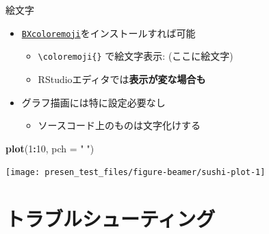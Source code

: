 \documentclass[
  14pt,
  ignorenonframetext,
]{beamer}
\newenvironment{Shaded}{\begin{snugshade}}{\end{snugshade}}
\newcommand{\DataTypeTok}[1]{\textcolor[rgb]{0.13,0.29,0.53}{#1}}
\newcommand{\DecValTok}[1]{\textcolor[rgb]{0.00,0.00,0.81}{#1}}
\newcommand{\KeywordTok}[1]{\textcolor[rgb]{0.13,0.29,0.53}{\textbf{#1}}}
\newcommand{\NormalTok}[1]{#1}
\newcommand{\OperatorTok}[1]{\textcolor[rgb]{0.81,0.36,0.00}{\textbf{#1}}}
\newcommand{\StringTok}[1]{\textcolor[rgb]{0.31,0.60,0.02}{#1}}
\providecommand{\tightlist}{%
  \setlength{\itemsep}{0pt}\setlength{\parskip}{0pt}}
\begin{document}
\begin{frame}[fragile]{絵文字}
\protect\hypertarget{ux7d75ux6587ux5b57}{}

\begin{itemize}
\tightlist
\item
  \href{https://github.com/zr-tex8r/BXcoloremoji}{\texttt{BXcoloremoji}}をインストールすれば可能

  \begin{itemize}
  \tightlist
  \item
    \texttt{\textbackslash{}coloremoji\{\}} で絵文字表示:
    \ifdefined{} {} \else (ここに絵文字) \fi
  \item
    RStudioエディタでは\textbf{表示が変な場合も}
  \end{itemize}
\item
  グラフ描画には特に設定必要なし

  \begin{itemize}
  \tightlist
  \item
    ソースコード上のものは文字化けする
  \end{itemize}
\end{itemize}

\begin{Shaded}
\begin{Highlighting}[]
\KeywordTok{plot}\NormalTok{(}\DecValTok{1}\OperatorTok{:}\DecValTok{10}\NormalTok{, }\DataTypeTok{pch =} \StringTok{"🍣"}\NormalTok{)}
\end{Highlighting}
\end{Shaded}

\begin{center}\texttt{[image: presen\_test\_files/figure-beamer/sushi-plot-1]} \end{center}

\end{frame}

\hypertarget{ux30c8ux30e9ux30d6ux30ebux30b7ux30e5ux30fcux30c6ux30a3ux30f3ux30b0}{%
\section{トラブルシューティング}\label{ux30c8ux30e9ux30d6ux30ebux30b7ux30e5ux30fcux30c6ux30a3ux30f3ux30b0}}
\end{document}

